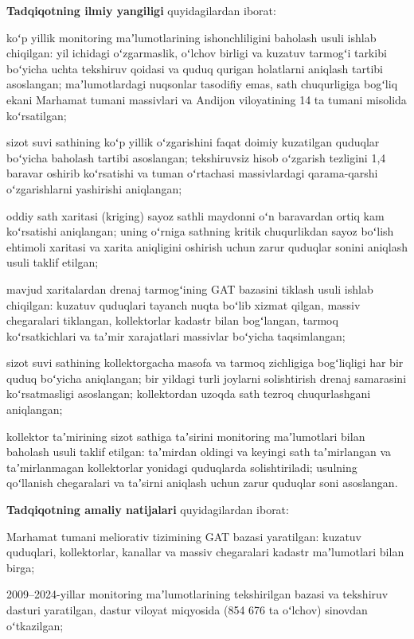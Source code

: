 \textbf{Tadqiqotning ilmiy yangiligi} quyidagilardan iborat:

koʻp yillik monitoring maʼlumotlarining ishonchliligini baholash usuli
ishlab chiqilgan: yil ichidagi oʻzgarmaslik, oʻlchov birligi va kuzatuv
tarmogʻi tarkibi boʻyicha uchta tekshiruv qoidasi va quduq qurigan
holatlarni aniqlash tartibi asoslangan; maʼlumotlardagi nuqsonlar
tasodifiy emas, sath chuqurligiga bogʻliq ekani Marhamat tumani
massivlari va Andijon viloyatining 14 ta tumani misolida koʻrsatilgan;

sizot suvi sathining koʻp yillik oʻzgarishini faqat doimiy kuzatilgan
quduqlar boʻyicha baholash tartibi asoslangan; tekshiruvsiz hisob
oʻzgarish tezligini 1,4 baravar oshirib koʻrsatishi va tuman oʻrtachasi
massivlardagi qarama-qarshi oʻzgarishlarni yashirishi aniqlangan;

oddiy sath xaritasi (kriging) sayoz sathli maydonni oʻn baravardan ortiq
kam koʻrsatishi aniqlangan; uning oʻrniga sathning kritik chuqurlikdan
sayoz boʻlish ehtimoli xaritasi va xarita aniqligini oshirish uchun
zarur quduqlar sonini aniqlash usuli taklif etilgan;

mavjud xaritalardan drenaj tarmogʻining GAT bazasini tiklash usuli
ishlab chiqilgan: kuzatuv quduqlari tayanch nuqta boʻlib xizmat qilgan,
massiv chegaralari tiklangan, kollektorlar kadastr bilan bogʻlangan,
tarmoq koʻrsatkichlari va taʼmir xarajatlari massivlar boʻyicha
taqsimlangan;

sizot suvi sathining kollektorgacha masofa va tarmoq zichligiga
bogʻliqligi har bir quduq boʻyicha aniqlangan; bir yildagi turli
joylarni solishtirish drenaj samarasini koʻrsatmasligi asoslangan;
kollektordan uzoqda sath tezroq chuqurlashgani aniqlangan;

kollektor taʼmirining sizot sathiga taʼsirini monitoring maʼlumotlari
bilan baholash usuli taklif etilgan: taʼmirdan oldingi va keyingi sath
taʼmirlangan va taʼmirlanmagan kollektorlar yonidagi quduqlarda
solishtiriladi; usulning qoʻllanish chegaralari va taʼsirni aniqlash
uchun zarur quduqlar soni asoslangan.

\textbf{Tadqiqotning amaliy natijalari} quyidagilardan iborat:

Marhamat tumani meliorativ tizimining GAT bazasi yaratilgan: kuzatuv
quduqlari, kollektorlar, kanallar va massiv chegaralari kadastr
maʼlumotlari bilan birga;

2009--2024-yillar monitoring maʼlumotlarining tekshirilgan bazasi va
tekshiruv dasturi yaratilgan, dastur viloyat miqyosida (854 676 ta
oʻlchov) sinovdan oʻtkazilgan;


